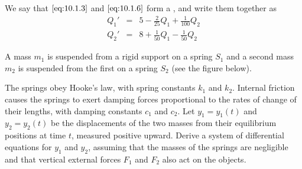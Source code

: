 \documentclass{ximera}
\begin{document}
\begin{example}
\begin{explanation}
We say that $\eqref{eq:10.1.3}$ and $\eqref{eq:10.1.6}$  form a , and write them together as
\begin{eqnarray*}
Q_1'&=&5-\frac{2}{25}Q_1+\frac{1}{100}Q_2\\
Q_2'&=&8+\frac{1}{50}Q_1-\frac{1}{50}Q_2
\end{eqnarray*}

\end{explanation}
\end{example}


\begin{example}\label{example:10.1.2}
A mass $m_1$ is suspended from a rigid support on a spring $S_1$ and a
second mass $m_2$ is suspended from the first on a spring $S_2$
(see the figure below). 

\begin{center}
\end{center}


The springs obey Hooke's law, with spring
constants $k_1$ and $k_2$. Internal friction causes the springs to
exert damping forces proportional to the rates of change of their
lengths, with damping constants $c_1$ and $c_2$. Let $y_1=y_1(t)$ and
$y_2=y_2(t)$ be the displacements of the two masses from their
equilibrium positions at time $t$, measured positive upward.
 Derive a system of differential equations
for $y_1$ and $y_2$, assuming that the masses of the springs are
negligible and that vertical external forces $F_1$ and $F_2$ also act
on the objects.



\end{example}
\end{document}
